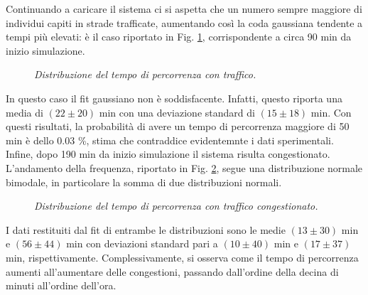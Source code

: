 \documentclass[../main.tex]{subfiles}
\begin{document}
Continuando a caricare il sistema ci si aspetta che un numero sempre maggiore di individui capiti in strade trafficate, aumentando cos\`i la coda gaussiana tendente a tempi pi\`u elevati: \`e il caso riportato in Fig. \ref{fig:frequency_flow}, corrispondente a circa 90 min da inizio simulazione.
\begin{figure}[H]
    \centering
    \caption[Distribuzione del tempo di percorrenza con traffico]{\emph{Distribuzione del tempo di percorrenza con traffico.}}
    \label{fig:frequency_flow}
\end{figure}
In questo caso il fit gaussiano non \`e soddisfacente. Infatti, questo riporta una media di $(22 \pm 20)$ min con una deviazione standard di $(15 \pm 18)$ min.
Con questi risultati, la probabilit\`a di avere un tempo di percorrenza maggiore di 50 min \`e dello 0.03 \%, stima che contraddice evidentemnte i dati sperimentali.
Infine, dopo 190 min da inizio simulazione il sistema risulta congestionato.
L'andamento della frequenza, riportato in Fig. \ref{fig:frequency_congested_flow}, segue una distribuzione normale bimodale, in particolare la somma di due distribuzioni normali.
\begin{figure}[H]
    \centering
    \caption[Distribuzione del tempo di percorrenza con traffico congestionato]{\emph{Distribuzione del tempo di percorrenza con traffico congestionato.}}
    \label{fig:frequency_congested_flow}
\end{figure}
I dati restituiti dal fit di entrambe le distribuzioni sono le medie $(13 \pm 30)$ min e $(56 \pm 44)$ min con deviazioni standard pari a $(10 \pm 40)$ min e $(17 \pm 37)$ min, rispettivamente.
Complessivamente, si osserva come il tempo di percorrenza aumenti all'aumentare delle congestioni, passando dall'ordine della decina di minuti all'ordine dell'ora.
\end{document}

